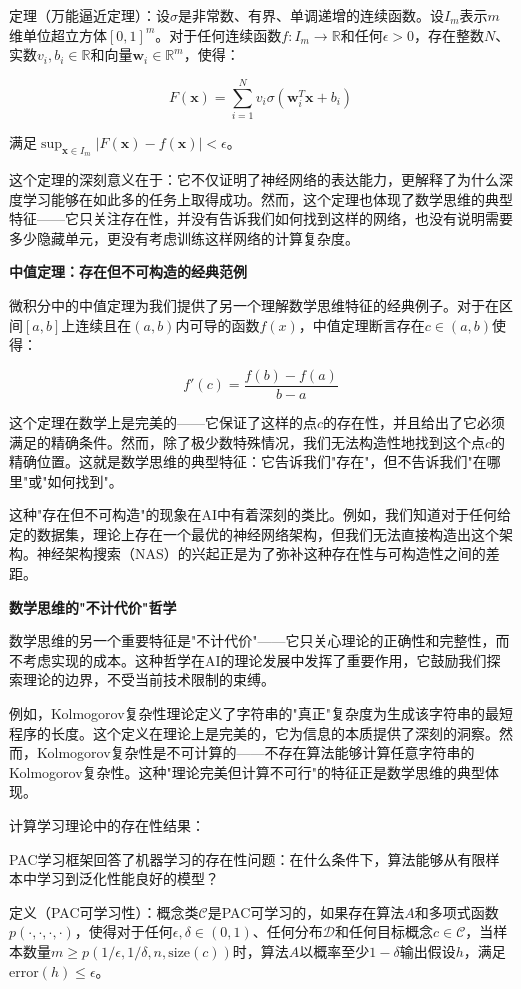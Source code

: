 定理（万能逼近定理）：设$\sigma$是非常数、有界、单调递增的连续函数。设$I_m$表示$m$维单位超立方体$[0,1]^m$。对于任何连续函数$f: I_m \to \mathbb{R}$和任何$\epsilon > 0$，存在整数$N$、实数$v_i, b_i \in \mathbb{R}$和向量$\mathbf{w}_i \in \mathbb{R}^m$，使得：

$$F(\mathbf{x}) = \sum_{i=1}^{N} v_i \sigma(\mathbf{w}_i^T \mathbf{x} + b_i)$$

满足$\sup_{\mathbf{x} \in I_m} |F(\mathbf{x}) - f(\mathbf{x})| < \epsilon$。

这个定理的深刻意义在于：它不仅证明了神经网络的表达能力，更解释了为什么深度学习能够在如此多的任务上取得成功。然而，这个定理也体现了数学思维的典型特征——它只关注存在性，并没有告诉我们如何找到这样的网络，也没有说明需要多少隐藏单元，更没有考虑训练这样网络的计算复杂度。

\textbf{中值定理：存在但不可构造的经典范例}

微积分中的中值定理为我们提供了另一个理解数学思维特征的经典例子。对于在区间$[a,b]$上连续且在$(a,b)$内可导的函数$f(x)$，中值定理断言存在$c \in (a,b)$使得：

$$f'(c) = \frac{f(b) - f(a)}{b - a}$$

这个定理在数学上是完美的——它保证了这样的点$c$的存在性，并且给出了它必须满足的精确条件。然而，除了极少数特殊情况，我们无法构造性地找到这个点$c$的精确位置。这就是数学思维的典型特征：它告诉我们"存在"，但不告诉我们"在哪里"或"如何找到"。

这种"存在但不可构造"的现象在AI中有着深刻的类比。例如，我们知道对于任何给定的数据集，理论上存在一个最优的神经网络架构，但我们无法直接构造出这个架构。神经架构搜索（NAS）的兴起正是为了弥补这种存在性与可构造性之间的差距。

\textbf{数学思维的"不计代价"哲学}

数学思维的另一个重要特征是"不计代价"——它只关心理论的正确性和完整性，而不考虑实现的成本。这种哲学在AI的理论发展中发挥了重要作用，它鼓励我们探索理论的边界，不受当前技术限制的束缚。

例如，Kolmogorov复杂性理论定义了字符串的"真正"复杂度为生成该字符串的最短程序的长度。这个定义在理论上是完美的，它为信息的本质提供了深刻的洞察。然而，Kolmogorov复杂性是不可计算的——不存在算法能够计算任意字符串的Kolmogorov复杂性。这种"理论完美但计算不可行"的特征正是数学思维的典型体现。

计算学习理论中的存在性结果：

PAC学习框架回答了机器学习的存在性问题：在什么条件下，算法能够从有限样本中学习到泛化性能良好的模型？

定义（PAC可学习性）：概念类$\mathcal{C}$是PAC可学习的，如果存在算法$A$和多项式函数$p(\cdot, \cdot, \cdot, \cdot)$，使得对于任何$\epsilon, \delta \in (0,1)$、任何分布$\mathcal{D}$和任何目标概念$c \in \mathcal{C}$，当样本数量$m \geq p(1/\epsilon, 1/\delta, n, \text{size}(c))$时，算法$A$以概率至少$1-\delta$输出假设$h$，满足$\text{error}(h) \leq \epsilon$。

